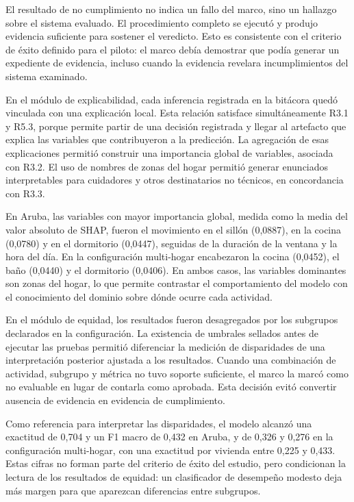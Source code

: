 El resultado de no cumplimiento no indica un fallo del marco, sino un hallazgo
sobre el sistema evaluado. El procedimiento completo se ejecutó y produjo
evidencia suficiente para sostener el veredicto. Esto es consistente con el
criterio de éxito definido para el piloto: el marco debía demostrar que podía
generar un expediente de evidencia, incluso cuando la evidencia revelara
incumplimientos del sistema examinado.

En el módulo de explicabilidad, cada inferencia registrada en la bitácora quedó
vinculada con una explicación local. Esta relación satisface simultáneamente
R3.1 y R5.3, porque permite partir de una decisión registrada y llegar al
artefacto que explica las variables que contribuyeron a la predicción. La
agregación de esas explicaciones permitió construir una importancia global de
variables, asociada con R3.2. El uso de nombres de zonas del hogar permitió
generar enunciados interpretables para cuidadores y otros destinatarios no
técnicos, en concordancia con R3.3.

En Aruba, las variables con mayor importancia global, medida como la media del
valor absoluto de SHAP, fueron el movimiento en el sillón (0,0887), en la cocina
(0,0780) y en el dormitorio (0,0447), seguidas de la duración de la ventana y la
hora del día. En la configuración multi-hogar encabezaron la cocina (0,0452), el
baño (0,0440) y el dormitorio (0,0406). En ambos casos, las variables
dominantes son zonas del hogar, lo que permite contrastar el comportamiento del
modelo con el conocimiento del dominio sobre dónde ocurre cada actividad.

En el módulo de equidad, los resultados fueron desagregados por los subgrupos
declarados en la configuración. La existencia de umbrales sellados antes de
ejecutar las pruebas permitió diferenciar la medición de disparidades de una
interpretación posterior ajustada a los resultados. Cuando una combinación de
actividad, subgrupo y métrica no tuvo soporte suficiente, el marco la marcó como
no evaluable en lugar de contarla como aprobada. Esta decisión evitó convertir
ausencia de evidencia en evidencia de cumplimiento.

Como referencia para interpretar las disparidades, el modelo alcanzó una
exactitud de 0,704 y un F1 macro de 0,432 en Aruba, y de 0,326 y 0,276 en la
configuración multi-hogar, con una exactitud por vivienda entre 0,225 y 0,433.
Estas cifras no forman parte del criterio de éxito del estudio, pero condicionan
la lectura de los resultados de equidad: un clasificador de desempeño modesto
deja más margen para que aparezcan diferencias entre subgrupos.


